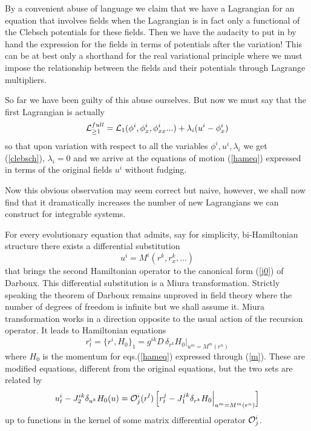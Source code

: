 \documentclass[a4paper,12pt]{article}
\begin{document}
By a convenient abuse of language we claim that we have a
Lagrangian for an equation that involves fields when the
Lagrangian is in fact only a functional of the Clebsch potentials
for these fields. Then we have the audacity to put in by hand the
expression for the fields in terms of potentials after the
variation! This can be at best only a shorthand for the real
variational principle where we must impose the relationship
between the fields and their potentials through Lagrange
multipliers.

So far we have been guilty of this abuse ourselves. But now we
must say that the first Lagrangian is actually
\begin{equation}
{\cal L}_{\ge 1}^{full} = {\cal L}_1(\phi^i, \phi^i_x,
\phi^i_{xx}...) + \lambda_i ( u^i - \phi^i_x ) \label{reallag}
\end{equation}
so that upon variation with respect to all the variables $\phi^i,
u^i, \lambda_i$ we get (\ref{clebsch}), $\lambda_i=0$ and we
arrive at the equations of motion (\ref{hameq}) expressed in terms
of the original fields $u^i$ without fudging.

Now this obvious observation may seem correct but naive, however,
we shall now find that it dramatically increases the number of new
Lagrangians we can construct for integrable systems.

For every evolutionary equation that admits, say for simplicity,
bi-Hamil\-tonian structure there exists a differential
substitution
\begin{equation}
u^i=M^i(r^k, r^k_x, ...) \label{m}
\end{equation}
that brings the second Hamiltonian operator to the canonical form
(\ref{j0}) of Darboux. This differential substitution is a Miura
transformation. Strictly speaking the theorem of Darboux remains
unproved in field theory where the number of degrees of freedom is
infinite but we shall assume it. Miura transformation works in a
direction opposite to the usual action of the recursion operator.
It leads to Hamiltonian equations
\begin{equation}
r^i_{t} = \{r^i, H_0\}_1 =  g^{ik} D \, \delta_{r^k}
H_0\Big|_{u^m=M^m(r^n)} \label{hameqmod}
\end{equation}
where $H_0$ is the momentum for eqs.(\ref{hameq}) expressed
through (\ref{m}). These are modified equations, different from
the original equations, but the two sets are related by
\begin{equation}
u^i_{t} - J_2^{ik} \delta_{u^k} H_0 (u) = {\cal O}^i_j (r^l) \,
\Big[ r^j_{t} - J_1^{jk} \delta_{r^k} H_0 \Big|_{u^m=M^m(r^n)}
\Big] \label{mm3}
\end{equation}
up to functions in the kernel of some matrix differential operator
${\cal O}^i_j$.
\end{document}
